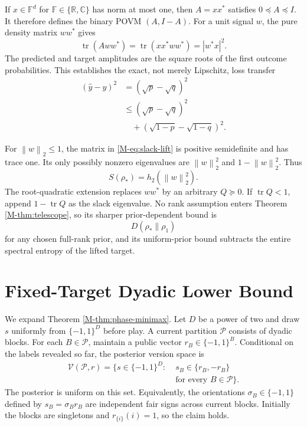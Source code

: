 \documentclass[twoside]{article}
\newcommand{\tr}{\operatorname{tr}}
\newcommand{\norm}[1]{\left\lVert #1\right\rVert}
\begin{document}
If $x\in\mathbb F^d$ for $\mathbb F\in\{\mathbb R,\mathbb C\}$ has norm at most one, then $A=xx^*$ satisfies $0\preceq A\preceq I$. It therefore defines the binary POVM $(A,I-A)$. For a unit signal $w$, the pure density matrix $ww^*$ gives
\begin{equation}
\tr(Aww^*)=\tr(xx^*ww^*)=|w^*x|^2.
\end{equation}
The predicted and target amplitudes are the square roots of the first outcome probabilities. This establishes the exact, not merely Lipschitz, loss transfer
\begin{align}
(\widehat y-y)^2&=(\sqrt p-\sqrt q)^2\nonumber\\
&\leq(\sqrt p-\sqrt q)^2\nonumber\\
&\quad +(\sqrt{1-p}-\sqrt{1-q})^2.
\end{align}

For $\norm w_2\leq1$, the matrix in \eqref{M-eq:slack-lift} is positive semidefinite and has trace one. Its only possibly nonzero eigenvalues are $\norm w_2^2$ and $1-\norm w_2^2$. Thus
\begin{equation}
S(\rho_*)=h_2(\norm w_2^2).
\end{equation}
The root-quadratic extension replaces $ww^*$ by an arbitrary $Q\succeq0$. If $\tr Q<1$, append $1-\tr Q$ as the slack eigenvalue. No rank assumption enters Theorem \ref{M-thm:telescope}, so its sharper prior-dependent bound is
\begin{equation}
D(\rho_*\|\rho_1)
\end{equation}
for any chosen full-rank prior, and its uniform-prior bound subtracts the entire spectral entropy of the lifted target.

\section{Fixed-Target Dyadic Lower Bound}
\label{app:lower}

We expand Theorem \ref{M-thm:phase-minimax}. Let $D$ be a power of two and draw $s$ uniformly from $\{-1,1\}^D$ before play. A current partition $\mathcal P$ consists of dyadic blocks. For each $B\in\mathcal P$, maintain a public vector $r_B\in\{-1,1\}^B$. Conditional on the labels revealed so far, the posterior version space is
\begin{align}
\mathcal V(\mathcal P,r)=\{s\in\{-1,1\}^D:\;&s_B\in\{r_B,-r_B\}\nonumber\\
&\text{for every }B\in\mathcal P\}.
\label{eq:version-space}
\end{align}
The posterior is uniform on this set. Equivalently, the orientations $\sigma_B\in\{-1,1\}$ defined by $s_B=\sigma_Br_B$ are independent fair signs across current blocks. Initially the blocks are singletons and $r_{\{i\}}(i)=1$, so the claim holds.
\end{document}

